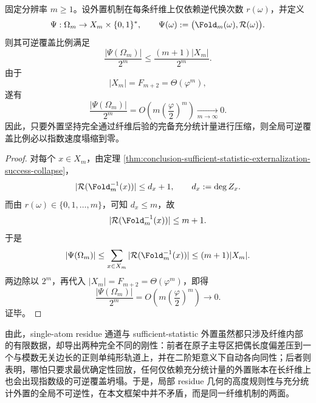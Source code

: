 \begin{corollary}[完备充分统计外置的全局可逆覆盖比例坍缩]\label{cor:conclusion-sufficient-statistic-global-coverage-collapse}
固定分辨率 \(m\ge 1\)。设外置机制在每条纤维上仅依赖逆代换次数 \(r(\omega)\)，并定义
\[
\Psi:\Omega_m\to X_m\times\{0,1\}^\ast,
\qquad
\Psi(\omega):=\bigl(\Fold_m(\omega),\mathcal R(\omega)\bigr).
\]
则其可逆覆盖比例满足
\[
\frac{|\Psi(\Omega_m)|}{2^m}
\le
\frac{(m+1)|X_m|}{2^m}.
\]
由于
\[
|X_m|=F_{m+2}=\Theta(\varphi^m),
\]
遂有
\[
\frac{|\Psi(\Omega_m)|}{2^m}
=
O\!\left(m\left(\frac{\varphi}{2}\right)^m\right)\xrightarrow[m\to\infty]{}0.
\]
因此，只要外置坚持完全通过纤维后验的完备充分统计量进行压缩，则全局可逆覆盖比例必以指数速度塌缩到零。
\end{corollary}
\begin{proof}
对每个 \(x\in X_m\)，由定理 \ref{thm:conclusion-sufficient-statistic-externalization-success-collapse}，
\[
|\mathcal R(\Fold_m^{-1}(x))|\le d_x+1,
\qquad
d_x:=\deg Z_x.
\]
而由 \(r(\omega)\in\{0,1,\dots,m\}\)，可知 \(d_x\le m\)，故
\[
|\mathcal R(\Fold_m^{-1}(x))|\le m+1.
\]
于是
\[
|\Psi(\Omega_m)|
\le
\sum_{x\in X_m}|\mathcal R(\Fold_m^{-1}(x))|
\le
(m+1)|X_m|.
\]
两边除以 \(2^m\)，再代入 \(|X_m|=F_{m+2}=\Theta(\varphi^m)\)，即得
\[
\frac{|\Psi(\Omega_m)|}{2^m}
=
O\!\left(m\left(\frac{\varphi}{2}\right)^m\right)\to 0.
\]
证毕。
\end{proof}

\noindent
由此，single-atom residue 通道与 sufficient-statistic 外置虽然都只涉及纤维内部的有限数据，却导出两种完全不同的刚性：前者在原子主导区把偶长度偏差压到一个与模数无关边长的正则单纯形轨道上，并在二阶矩意义下自动各向同性；后者则表明，哪怕只要求最优确定性回放，任何仅依赖充分统计量的外置账本在长纤维上也会出现指数级的可逆覆盖坍塌。于是，局部 residue 几何的高度规则性与充分统计外置的全局不可逆性，在本文框架中并不矛盾，而是同一纤维机制的两面。

\endinput
